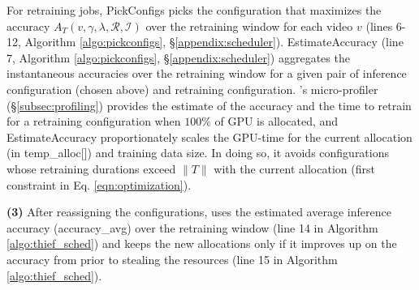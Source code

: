 For retraining jobs, {\sf\footnotesize PickConfigs} picks the configuration that maximizes the accuracy $A_T(v, \gamma, \lambda, \mathcal{R}, \mathcal{I})$ over the retraining window for each video $v$ (lines 6-12, Algorithm \ref{algo:pickconfigs}, \S{\ref{appendix:scheduler}}). {\sf\footnotesize EstimateAccuracy} (line 7, Algorithm \ref{algo:pickconfigs}, \S\ref{appendix:scheduler}) aggregates the instantaneous accuracies over the retraining window for a given pair of inference configuration (chosen above) and retraining configuration. {\name}'s micro-profiler (\S\ref{subsec:profiling}) provides the estimate of the accuracy and the time to retrain for a retraining configuration when $100\%$ of GPU is allocated, and {\sf\footnotesize EstimateAccuracy} proportionately scales the GPU-time for the current allocation (in {\small temp\_alloc[]}) and training data size. In doing so, it avoids configurations whose retraining durations exceed $\lVert T \rVert$ with the current allocation (first constraint in Eq. \ref{eqn:optimization}). %


{\bf (3)} After reassigning the configurations, {\name} uses the estimated average inference accuracy (accuracy\_avg) over the retraining window (line 14 in Algorithm \ref{algo:thief_sched}) and keeps the new allocations only if it improves up on the accuracy from prior to stealing the resources (line 15 in Algorithm \ref{algo:thief_sched}).



